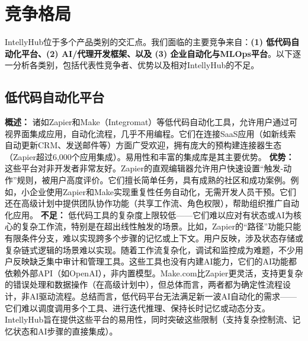 \documentclass[11点, A4纸, 单面]{article}
\begin{document}
\section{竞争格局}
IntellyHub位于多个产品类别的交汇点。我们面临的主要竞争来自：\textbf{(1) 低代码自动化平台、(2) AI/代理开发框架、以及 (3) 企业自动化与MLOps平台}。以下逐一分析各类别，包括代表性竞争者、优势以及相对IntellyHub的不足。

\subsection{低代码自动化平台}

\textbf{概述：} 诸如Zapier和Make（Integromat）等低代码自动化工具，允许用户通过可视界面集成应用，自动化流程，几乎不用编程。它们在连接SaaS应用（如新线索自动更新CRM、发送邮件等）方面广受欢迎，拥有庞大的预构建连接器生态（Zapier超过6,000个应用集成\cite{zapierApps}）。易用性和丰富的集成库是其主要优势。
\newline\newline
\textbf{优势：} 这些平台对非开发者非常友好。Zapier的直观编辑器允许用户快速设置“触发-动作”规则，被用户高度评价\cite{g2ZapierReviews}。它们擅长简单任务，具有成熟的社区和成功案例。例如，小企业使用Zapier和Make实现重复性任务自动化，无需开发人员干预。它们还在高级计划中提供团队协作功能（共享工作流、角色权限），帮助组织推广自动化应用\cite{zapierPricing}。
\newline\newline
\textbf{不足：} 低代码工具的复杂度上限较低——它们难以应对有状态或AI为核心的复杂工作流，特别是在超出线性触发的场景。比如，Zapier的“路径”功能只能有限条件分支，难以实现跨多个步骤的记忆或上下文。用户反映，涉及状态存储或复杂链式逻辑的场景难以实现。随着工作流复杂化，调试和监控成为难题，不少用户反映缺乏集中审计和管理工具\cite{g2ZapierReviews}。这些工具也没有内建AI能力，它们的AI功能都依赖外部API（如OpenAI），非内置模型\cite{zapierOpenAI}。Make.com比Zapier更灵活，支持更复杂的错误处理和数据操作（在高级计划中）\cite{g2MakeVsZapier}，但总体而言，两者都为确定性流程设计，非AI驱动流程。总结而言，低代码平台无法满足新一波AI自动化的需求——它们难以调度调用多个工具、进行迭代推理、保持长时记忆或动态分支。IntellyHub旨在提供这些平台的易用性，同时突破这些限制（支持复杂控制流、记忆状态和AI步骤的直接集成）。
\end{document}
